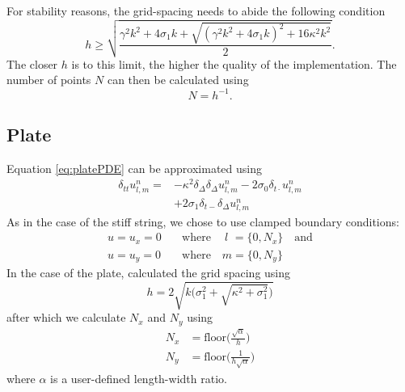 \documentclass{article}
\begin{document}
For stability reasons, the grid-spacing needs to abide the following condition
\begin{equation}\label{eq:stabilityString}
    h \geq \sqrt{\frac{\gamma^2 k^2 + 4 \sigma_1 k + \sqrt {(\gamma^2 k^2 + 4 \sigma_1 k)^2 + 16 \kappa^2 k^2}}{2}}.
\end{equation}
The closer $h$ is to this limit, the higher the quality of the implementation. The number of points $N$ can then be calculated using 
\begin{equation}
    N = h^{-1}.
\end{equation}

\subsection{Plate}
Equation \eqref{eq:platePDE} can be approximated using
\begin{equation}
    \begin{aligned}\label{eq:plateFDS}
        \delta_{tt}u_{l,m}^n = &-\kappa^2 \delta_\Delta\delta_\Delta u_{l,m}^n - 2\sigma_0\delta_{t\cdot}u_{l,m}^n \\
        &+ 2\sigma_1\delta_{t-}\delta_\Delta u_{l,m}^n
    \end{aligned}
\end{equation}
As in the case of the stiff string, we chose to use clamped boundary conditions:
\begin{equation}
    \begin{aligned}
        u = u_x = 0 \quad &\text{where} \quad \: l \, \, = \{0, N_x\} \quad \text{and} \\
        u = u_y = 0 \quad &\text{where} \quad m = \{0, N_y\}
    \end{aligned}
\end{equation}
In the case of the plate, calculated the grid spacing using \cite{Bilbao2009:ModularPercussion}
\begin{equation}
h = 2\sqrt{k\bigg(\sigma_1^2 + \sqrt{\kappa^2+ \sigma_1^2}\bigg)}
\end{equation}
after which we calculate $N_x$ and $N_y$ using
\begin{align}
    N_x &= \text{floor}\Bigg(\frac{\sqrt{\alpha}}{h}\Bigg)\\
    N_y &= \text{floor}\Bigg(\frac{1}{h\sqrt{\alpha}}\Bigg)
\end{align}
where $\alpha$ is a user-defined length-width ratio.
\end{document}
